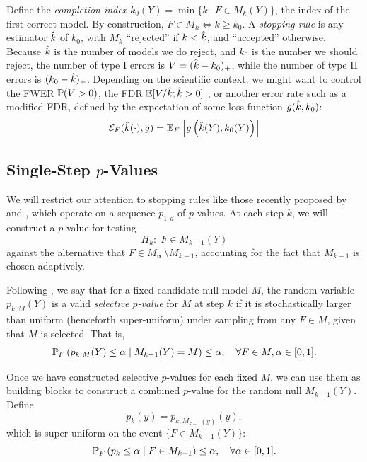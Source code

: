 \documentclass{article}
\begin{document}
Define the {\em completion index} $k_0(Y) = \min\{k:\; F \in M_k(Y)\}$, the index of the first correct model. By construction, $F\in M_k \iff k \geq k_0$. A {\em stopping rule} is any estimator $\hk$ of $k_0$, with $M_k$ ``rejected'' if $k < \hk$, and ``accepted'' otherwise. Because $\hk$ is the number of models we do reject, and $k_0$ is the number we should reject, the number of type I errors is $V=(\hk-k_0)_+$, while the number of type II errors is $(k_0-\hk)_+$. Depending on the scientific context, we might want to control the FWER $\P(V>0)$, the FDR $\E[V/\hk; \hk>0]$ , or another error rate such as a modified FDR, defined by the expectation of some loss function $g(\hk, k_0)$:
\begin{equation}\label{eq:errRate}
\Err_F(\hk(\cdot), g) = \E_F\left[ g\left(\hk(Y), k_0(Y)\right)\right]
\end{equation}

\subsection{Single-Step $p$-Values}\label{sec:singleStep}

We will restrict our attention to stopping rules like those recently proposed by \citet{gsell2013sequential} and \citet{li2015accumulation}, which operate on a sequence $p_{1:d}$ of $p$-values. At each step $k$, we will construct a $p$-value for testing
\[
H_{k}:\; F\in M_{k-1}(Y)
\]
against the alternative that $F\in M_\infty\setminus M_{k-1}$, accounting for the fact that $M_{k-1}$ is chosen adaptively.

Following \citet{fithian2014optimal}, we say that for a fixed candidate null model $M$, the random variable $p_{k,M}(Y)$ is a valid {\em selective $p$-value} for $M$ at step $k$ if it is stochastically larger than uniform (henceforth super-uniform) under sampling from any $F\in M$, given that $M$ is selected. That is,
\begin{equation}
\P_F\left(p_{k,M}(Y) \leq \alpha \mid M_{k-1}(Y) = M\right) 
\leq \alpha, \quad \forall F\in M, \alpha \in [0,1].
\end{equation}

Once we have constructed selective $p$-values for each fixed $M$, we can use them as building blocks to construct a combined $p$-value for the random null $M_{k-1}(Y)$. Define
\[
p_k(y) = p_{k, M_{k-1}(y)}(y),
\]
which is super-uniform on the event $\{F \in M_{k-1}(Y)\}$:
\begin{equation}\label{eq:selectiveGuaranteePk}
\P_F\left(p_k \leq \alpha \mid F\in M_{k-1}\right) \leq \alpha, \quad \forall \alpha \in [0,1].
\end{equation}
\end{document}
